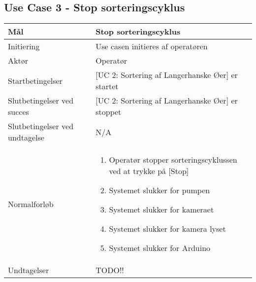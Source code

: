 \subsection{Use Case 3 - Stop sorteringscyklus}
\begin{center}
		\begin{longtable}{ | m{4cm} | m{8cm}| } 
			\hline
			Mål & Stop sorteringscyklus \\ 
			\hline
			Initiering &  Use casen initieres af operatøren\\
			\hline
			Aktør & Operatør \\ 
			\hline
			Startbetingelser & [UC 2: Sortering af Langerhanske Øer] er startet\\ 
			\hline	
			Slutbetingelser ved succes & [UC 2: Sortering af Langerhanske Øer] er stoppet \\
			\hline
			Slutbetingelser ved undtagelse & N/A \\
			\hline
			Normalforløb & \begin{enumerate}
				\setlength\itemsep{0cm} %
				\item Operatør stopper sorteringscyklussen ved at trykke på [Stop]
				\subitem [Undtagelse 1: Tom celleopløsningsbeholder]
				\item Systemet slukker for pumpen
				\item Systemet slukker for kameraet
				\item Systemet slukker for kamera lyset
				\item Systemet slukker for Arduino
			\end{enumerate} \\ 
			\hline
			Undtagelser & TODO!!\\
			\hline
		\end{longtable}
		
	\end{center}
	\pagebreak